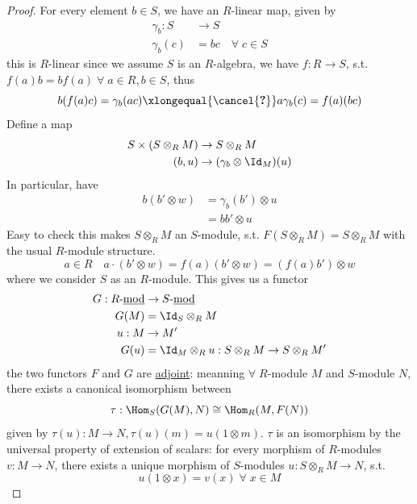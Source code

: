 \begin{eg}
	\begin{proof}
		For every element \( b \in S \), we have an \( R \)-linear map, given by
		\[
			\begin{aligned}
				\gamma_b: S & \to S                         \\
				\gamma_b(c) & = bc \quad \forall \; c \in S
			\end{aligned}
		\]
		this is \( R \)-linear since we assume \( S \) is an \( R \)-algebra, we have \( f: R\to S \),
		s.t. \( f(a) b = b f(a) \; \forall\; a\in R, b \in S \), thus
		\[
			b(f(a)c) = \gamma_b(ac) \xlongequal{\cancel{\textbf{?}}} a \gamma_b (c) = f(a)(bc)
		\]
		Define a map
		\[
			\begin{aligned}
				S\times (S\otimes_R M) & \to S\otimes_R M                 \\
				(b,u)                  & \to (\gamma_b \otimes \Id_M) (u)
			\end{aligned}
		\]
		In particular, have
		\[
			\begin{aligned}
				b(b'\otimes w) & = \gamma_b (b') \otimes u \\
				               & = bb' \otimes u
			\end{aligned}
		\]
		Easy to check this makes \( S \otimes_R M\) an \( S \)-module, s.t. \( F(S\otimes_R M) = S
		\otimes_R M \) with the usual \( R \)-module structure.
		\[
			a\in R \quad a\cdot (b' \otimes w) = f(a) (b'\otimes w) = (f(a)b') \otimes w
		\]
		where we consider \( S \) as an \( R \)-module. This gives us a functor
		\[
			\begin{aligned}
				G: R\text{-\underline{mod}} & \to S\text{-\underline{mod}}                         \\
				G(M)                        & = \Id_S \otimes_R M                                  \\
				u: M                        & \to M'                                               \\
				G(u)                        & = \Id_M \otimes_R u : S\otimes_R M \to S\otimes_R M'
			\end{aligned}
		\]
		the two functors \( F \) and \( G \) are \underline{adjoint}: meanning
		\( \forall \; R \)-module \( M \) and \( S \)-module \( N \), there exists a canonical
		isomorphism between
		\[
			\tau: \Hom_S (G(M), N) \cong \Hom_R (M, F(N))
		\]
		given by \( \tau(u): M \to N, \tau(u)(m) = u(1\otimes m) \). \( \tau \) is an isomorphism by the
		universal property of extension of scalars: for every morphism of \( R \)-modules \( v: M \to N \), there exists a unique
		morphism of \( S \)-modules \( u: S\otimes_R M \to N \), s.t.
		\[
			u(1\otimes x) = v(x) \; \forall \; x \in M
		\]


\end{proof}
\end{eg}

